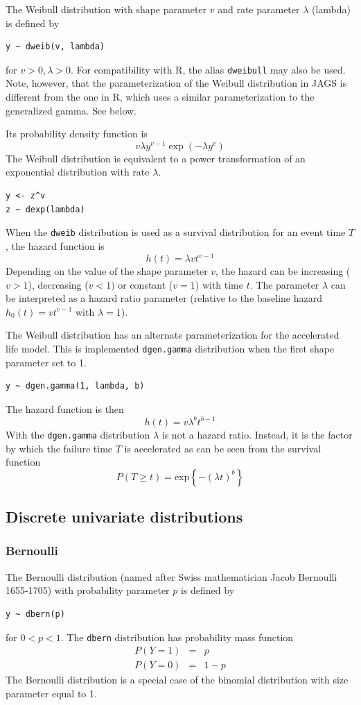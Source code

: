 \documentclass[11pt, a4paper, titlepage]{report}
\begin{document}
The Weibull distribution with shape parameter $v$ and rate parameter
$\lambda$ (lambda) is defined by
\begin{verbatim}
y ~ dweib(v, lambda)
\end{verbatim}
for $v > 0, \lambda > 0$. For compatibility with R, the alias
\texttt{dweibull} may also be used. Note, however, that the
parameterization of the Weibull distribution in JAGS is different from
the one in R, which uses a similar parameterization to the
generalized gamma. See below.

Its probability density function is
\[
v  \lambda  y^{v - 1} \exp (- \lambda y^v)
\]
The Weibull distribution is equivalent to a power transformation of
an exponential distribution with rate $\lambda$.
\begin{verbatim}
y <- z^v
z ~ dexp(lambda)
\end{verbatim}

When the \texttt{dweib} distribution is used as a survival
distribution for an event time $T$, the hazard function is
\[
h(t) = \lambda v t^{v-1}
\]
Depending on the value of the shape parameter $v$, the hazard can be
increasing ($v > 1$), decreasing ($v < 1)$ or constant ($v=1$) with
time $t$. The parameter $\lambda$ can be interpreted as a hazard ratio
parameter (relative to the baseline hazard $h_0(t) = v t^{v-1}$ with
$\lambda=1$).

The Weibull distribution has an alternate parameterization for the
accelerated life model. This is implemented \texttt{dgen.gamma}
distribution when the first shape parameter set to 1.
\begin{verbatim}
y ~ dgen.gamma(1, lambda, b)
\end{verbatim}
The hazard function is then
\[
h(t) = v \lambda^b t^{b-1}
\]
With the \texttt{dgen.gamma} distribution $\lambda$ is not a hazard
ratio. Instead, it is the factor by which the failure time $T$ is
accelerated as can be seen from the survival function
\[
P(T \geq t) = \mbox{exp}\left\{ - \left(\lambda t \right)^b \right\}
\]

\subsection{Discrete univariate distributions}

\subsubsection{Bernoulli}

The Bernoulli distribution (named after Swiss mathematician Jacob
Bernoulli 1655-1705) with probability parameter $p$ is defined by
\begin{verbatim}
y ~ dbern(p)
\end{verbatim}
for $0 < p < 1$. The \texttt{dbern} distribution has probability mass function
\begin{eqnarray*}
  P(Y=1) & = & p \\
  P(Y=0) & = & 1 - p
\end{eqnarray*}
The Bernoulli distribution is a special case of the binomial distribution
with size parameter equal to 1.
\end{document}
